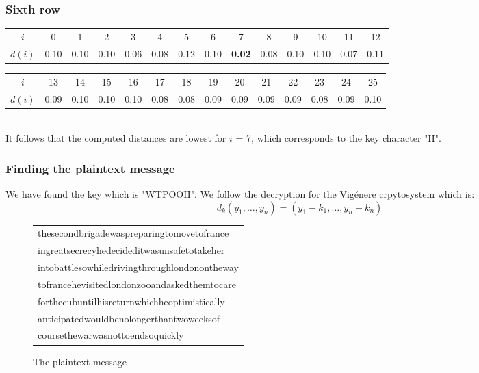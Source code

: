 \documentclass[11pt]{report}
\begin{document}
\subsubsection{Sixth row}
\begin{tabular}{| c | c c c c c c c c c c c c c |}
\hline
$i$ & 0 & 1 & 2 & 3 & 4 & 5 & 6 & 7 & 8 & 9 & 10 & 11 & 12\\
$d(i)$ & 0.10
& 0.10
& 0.10
& 0.06
& 0.08
& 0.12
& 0.10
& \textbf{0.02}
& 0.08
& 0.10
& 0.10
& 0.07
& 0.11\\
\hline
\end{tabular}

\begin{tabular}{| c | c c c c c c c c c c c c c |}
\hline
$i$ & 13 & 14 & 15 & 16 & 17 & 18 & 19 & 20 & 21 & 22 & 23 & 24 & 25\\
$d(i)$ & 0.09
& 0.10
& 0.10
& 0.10
& 0.08
& 0.08
& 0.09
& 0.09
& 0.09
& 0.09
& 0.08
& 0.09
& 0.10\\
\hline
\end{tabular}
${}$\\
It follows that the computed distances are lowest for $i$ = 7, which corresponds to the key
character "H".

\subsubsection*{Finding the plaintext message}
We have found the key which is "WTPOOH". We follow the decryption for the Vig\'{e}nere crpytosystem which is:
$$d_k(y_1,\dots,y_n) = (y_1 - k_1,\dots,y_n - k_n)$$

\begin{figure}
\centering
\begin{tabular}{| l |}
\hline
thesecondbrigadewaspreparingtomovetofrance\\
ingreatsecrecyhedecideditwasunsafetotakeher\\
intobattlesowhiledrivingthroughlondonontheway\\
tofrancehevisitedlondonzooandaskedthemtocare\\
forthecubuntilhisreturnwhichheoptimistically\\
anticipatedwouldbenolongerthantwoweeksof\\
coursethewarwasnottoendsoquickly\\
\hline
\end{tabular}
\caption{The plaintext message}
\end{figure}
\end{document}
